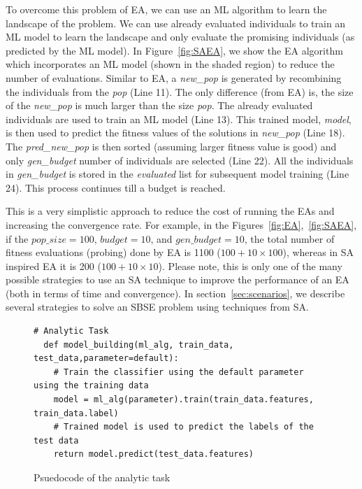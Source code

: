 \documentclass[table, xcdraw, sigconf,review, anonymous]{acmart}
\begin{document}
To overcome this problem of EA, we can use an ML algorithm to learn the landscape of the problem. We can use already evaluated individuals to train an ML model to learn the landscape and only evaluate the promising individuals (as predicted by the ML model). In Figure~\ref{fig:SAEA}, we show the EA algorithm which incorporates an ML model (shown in the shaded region)  to reduce the number of evaluations. Similar to EA, a \textit{new\_pop} is generated by recombining the individuals from the \textit{pop} (Line 11). The only difference (from EA) is, the size of the \textit{new\_pop} is much larger than the size \textit{pop}. The already evaluated individuals are used to train an ML model (Line 13). This trained model, \textit{model}, is then used to predict the fitness values of the solutions in \textit{new\_pop} (Line 18). The \textit{pred\_new\_pop} is then sorted (assuming larger fitness value is good) and only \textit{gen\_budget} number of individuals are selected (Line 22). All the individuals in \textit{gen\_budget} is stored in the \textit{evaluated} list for subsequent model training (Line 24). This process continues till a budget is reached. 

This is a very simplistic approach to reduce the cost of running the EAs and increasing the convergence rate. For example, in the Figures~\ref{fig:EA},~\ref{fig:SAEA}, if the $\mathit{pop\_size}=100$, $\mathit{budget}=10$, and $\mathit{gen\_budget}=10$, the total number of fitness evaluations (probing) done by EA is 1100 ($100 + 10\times100$), whereas in SA inspired EA it is 200 ($100 + 10\times10$). Please note, this is only one of the many possible strategies to use an SA technique to improve the performance of an EA (both in terms of time and convergence). In section~\ref{sec:scenarios}, we describe several strategies to solve an SBSE problem using techniques from SA. 


\begin{figure}[t]
\small
\hspace{0.4cm}
\begin{lstlisting}[xrightmargin=5.0ex,mathescape,frame=none,numbers=right]
  # Analytic Task
  def model_building(ml_alg, train_data, test_data,parameter=default):
    # Train the classifier using the default parameter using the training data
    model = ml_alg(parameter).train(train_data.features, train_data.label)
    # Trained model is used to predict the labels of the test data
    return model.predict(test_data.features)
\end{lstlisting}
\caption{\small{Psuedocode of the analytic task}
}
\label{fig:SA_default}  
\end{figure}
\end{document}
